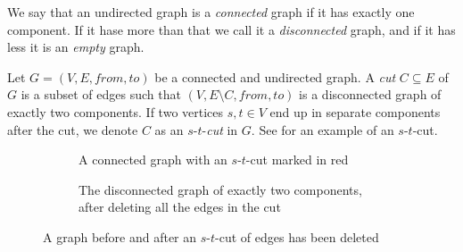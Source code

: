 \begin{definition}
    We say that an undirected graph is a \emph{connected} graph if it has exactly one component. If it hase more than that we call it a \emph{disconnected} graph, and if it has less it is an \emph{empty} graph.
\end{definition}

\begin{definition}[Cut]
    Let $G = (V, E, from, to)$ be a connected and undirected graph. A \emph{cut} $C \subseteq E$ of $G$ is a subset of edges such that $(V, E \setminus C, from, to)$ is a disconnected graph of exactly two components. If two vertices $s,t \in V$ end up in separate components after the cut, we denote $C$ as an $s$-$t$-\emph{cut} in $G$. See  for an example of an $s$-$t$-cut.
\end{definition}

\begin{figure}[H]
    \centering
    \begin{subfigure}{.45\textwidth}
        \caption{A connected graph with an $s$-$t$-cut marked in red}
        \label{subfigure:to-be-cut-graph}
    \end{subfigure}\hfill%
    \begin{subfigure}{.45\textwidth}
        \caption{The disconnected graph of exactly two components, after deleting all the edges in the cut}
        \label{subfigure:cut-graph}
    \end{subfigure}
    \caption{A graph before and after an $s$-$t$-cut of edges has been deleted}
    \label{figure:s-t-cut}
\end{figure}

